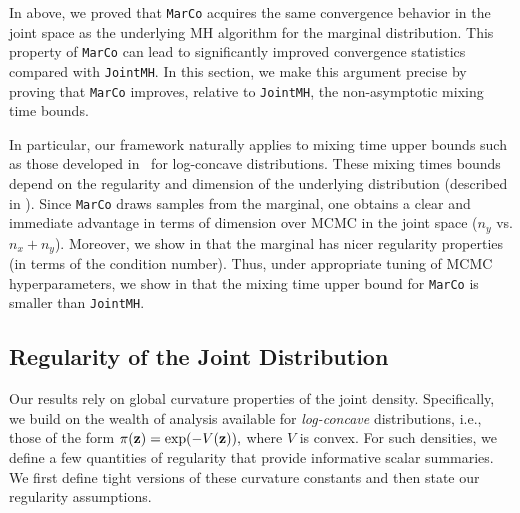\documentclass[onefignum,onetabnum]{siamonline250211}
\newcommand{\bfz}{{\bf z}}
\newcommand{\nx}{{n_{x}}}
\newcommand{\ny}{{n_{y}}}
\newcommand{\MarCo}{\textnormal{\texttt{MarCo}}\xspace}
\newcommand{\Joint}{\textnormal{\texttt{JointMH}}\xspace}
\begin{document}
%
In  above, we proved that \MarCo acquires the same convergence behavior in the joint space as the underlying MH algorithm for the marginal distribution.
%
This property of \MarCo can lead to 
%
significantly improved convergence statistics compared with \Joint.
In this section, we make this argument precise by proving that \MarCo improves, relative to \Joint, the non-asymptotic mixing time bounds.

In particular, our framework naturally applies to mixing time upper bounds such as those developed in~\cite{dwivedi_log-concave_2019,wu_minimax_2022,altschuler_resolving_2022,altschuler_faster_2024,chewi_analysis_2025} for log-concave distributions.
These mixing times bounds depend on the regularity and dimension of the underlying distribution (described in ).
%
Since \MarCo draws samples from the marginal, one obtains a clear and immediate advantage in terms of dimension over MCMC in the joint space ($\ny$ vs. $\nx + \ny$). Moreover, we show in  that the marginal has nicer regularity properties (in terms of the condition number). Thus, under appropriate tuning of MCMC hyperparameters, we show in  that the mixing time upper bound for \MarCo is smaller than \Joint.
%
\subsection{Regularity of the Joint Distribution}
\label{subsec:regularity}

Our results rely on global curvature properties of the joint density.
Specifically, we build on the wealth of analysis available for \emph{log-concave} distributions, i.e., those of the form $\pi(\bfz) = \exp(-V(\bfz)),$ where $V$ is convex.
For such densities, we define a few quantities of regularity that provide informative scalar summaries.
We first define tight versions of these curvature constants and then state our regularity assumptions.%
\end{document}
